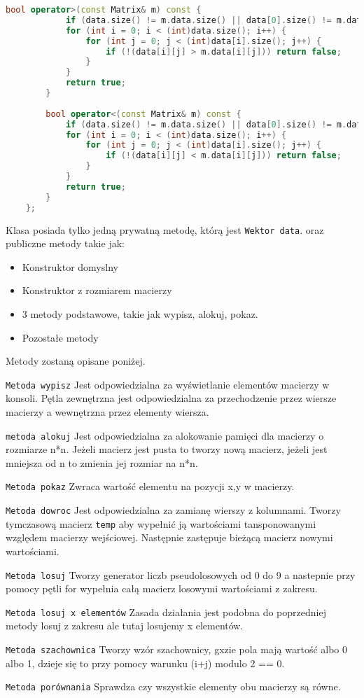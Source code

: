 \begin{lstlisting}[caption=Klasa \texttt{Matrix}, label={lst:matrixclass}, language=C++]
		bool operator>(const Matrix& m) const {
			if (data.size() != m.data.size() || data[0].size() != m.data[0].size()) return false;
			for (int i = 0; i < (int)data.size(); i++) {
				for (int j = 0; j < (int)data[i].size(); j++) {
					if (!(data[i][j] > m.data[i][j])) return false;
				}
			}
			return true;
		}
		
		bool operator<(const Matrix& m) const {
			if (data.size() != m.data.size() || data[0].size() != m.data[0].size()) return false;
			for (int i = 0; i < (int)data.size(); i++) {
				for (int j = 0; j < (int)data[i].size(); j++) {
					if (!(data[i][j] < m.data[i][j])) return false;
				}
			}
			return true;
		}
	};
\end{lstlisting}
  
Klasa posiada tylko jedną prywatną metodę, którą jest \texttt{Wektor data}. oraz publiczne metody takie jak:
\begin{itemize}
	\item Konstruktor domyslny
	\item Konstruktor z rozmiarem macierzy
	\item 3 metody podstawowe, takie jak wypisz, alokuj, pokaz.
	\item Pozostałe metody
\end{itemize}
Metody zostaną opisane poniżej.

\texttt{Metoda wypisz}
Jest odpowiedzialna za wyświetlanie elementów macierzy w konsoli. Pętla zewnętrzna jest odpowiedzialna za przechodzenie przez wiersze macierzy a wewnętrzna przez elementy wiersza.

\texttt{metoda alokuj}
Jest odpowiedzialna za alokowanie pamięci dla macierzy o rozmiarze n*n.
Jeżeli macierz jest pusta to tworzy nową macierz, jeżeli jest mniejsza od n to zmienia jej rozmiar na n*n.

\texttt{Metoda pokaz}
Zwraca wartość elementu na pozycji x,y w macierzy.

\texttt{Metoda dowroc}
Jest odpowiedzialna za zamianę wierszy z kolumnami. Tworzy tymczasową macierz \texttt{temp} aby wypełnić ją wartościami tansponowanymi względem macierzy wejściowej. Następnie zastępuje bieżącą macierz nowymi wartościami.

\texttt{Metoda losuj}
Tworzy generator liczb pseudolosowych od 0 do 9 a nastepnie przy pomocy pętli for wypełnia całą macierz losowymi wartościami z zakresu.

\texttt{Metoda losuj x elementów}
Zasada działania jest podobna do poprzedniej metody losuj z zakresu ale tutaj losujemy x elementów.

\texttt{Metoda szachownica}
Tworzy wzór szachownicy, gxzie pola mają wartość albo 0 albo 1, dzieje się to przy pomocy warunku (i+j) modulo 2 == 0.

\texttt{Metoda porównania}
Sprawdza czy wszystkie elementy obu macierzy są równe.
